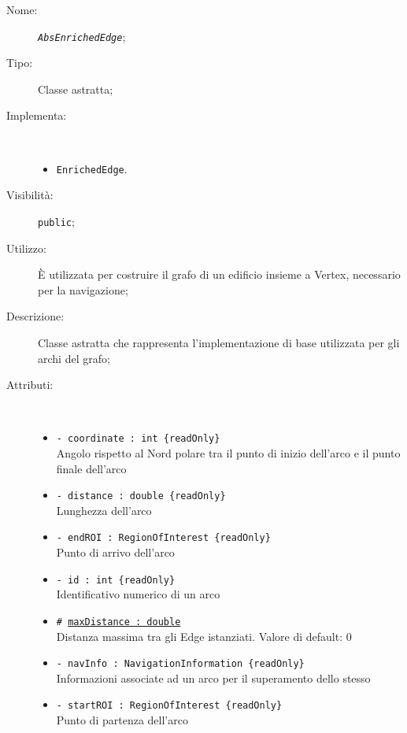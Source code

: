 \documentclass[../DefinizioneDiProdotto.tex]{subfiles}
\begin{document}
\begin{description}
	\item[Nome:] \texttt{\textit{AbsEnrichedEdge}};
	\item[Tipo:] Classe astratta;
	\item[Implementa:] \
	\begin{itemize}
		\item \texttt{EnrichedEdge}.
		
	\end{itemize}
	\item[Visibilità:] \texttt{public};
	\item[Utilizzo:] È utilizzata per costruire il grafo di un edificio insieme a Vertex, necessario per la navigazione;
	\item[Descrizione:] Classe astratta che rappresenta l'implementazione di base utilizzata per gli archi del grafo;
	\item[Attributi:] \
	\begin{itemize}
		\item \texttt{- coordinate : int \{readOnly\}}\\
		Angolo rispetto al Nord polare tra il punto di inizio dell'arco e il punto finale dell'arco
		
		\item \texttt{- distance : double \{readOnly\}}\\
		Lunghezza dell'arco
		
		\item \texttt{- endROI : RegionOfInterest \{readOnly\}}\\
		Punto di arrivo dell'arco
		
		\item \texttt{- id : int \{readOnly\}}\\
		Identificativo numerico di un arco
		
		\item \texttt{\# \underline{maxDistance : double}}\\
		Distanza massima tra gli Edge istanziati. Valore di default: 0
		
		\item \texttt{- navInfo : NavigationInformation \{readOnly\}}\\
		Informazioni associate ad un arco per il superamento dello stesso
		
		\item \texttt{- startROI : RegionOfInterest \{readOnly\}}\\
		Punto di partenza dell'arco
		

\end{itemize}
\end{description}
\end{document}
